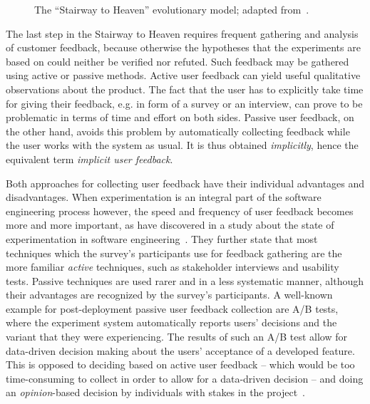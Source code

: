 \begin{figure}[ht]
        \caption{The ``Stairway to Heaven'' evolutionary model; adapted from~\cite{Olsson2012}.}
        \label{fig:stairway}
\end{figure}

The last step in the Stairway to Heaven requires frequent gathering and analysis of customer feedback, because otherwise the hypotheses that the experiments are based on could neither be verified nor refuted.
Such feedback may be gathered using active or passive methods.
Active user feedback can yield useful qualitative observations about the product.
The fact that the user has to explicitly take time for giving their feedback, e.g. in form of a survey or an interview, can prove to be problematic in terms of time and effort on both sides.
Passive user feedback, on the other hand, avoids this problem by automatically collecting feedback while the user works with the system as usual.
It is thus obtained \emph{implicitly}, hence the equivalent term \emph{implicit user feedback}.

Both approaches for collecting user feedback have their individual advantages and disadvantages.
When experimentation is an integral part of the software engineering process however, the speed and frequency of user feedback becomes more and more important, as \citeauthor{lindgren2015software} have discovered in a study about the state of experimentation in software engineering~\cite{lindgren2015software}.
They further state that most techniques which the survey's participants use for feedback gathering are the more familiar \emph{active} techniques, such as stakeholder interviews and usability tests.
Passive techniques are used rarer and in a less systematic manner, although their advantages are recognized by the survey's participants.
A well-known example for post-deployment passive user feedback collection are A/B tests, where the experiment system automatically reports users' decisions and the variant that they were experiencing.
The results of such an A/B test allow for data-driven decision making about the users' acceptance of a developed feature.
This is opposed to deciding based on active user feedback -- which would be too time-consuming to collect in order to allow for a data-driven decision -- and doing an \emph{opinion}-based decision by individuals with stakes in the project~\cite{Bosch2012}.

